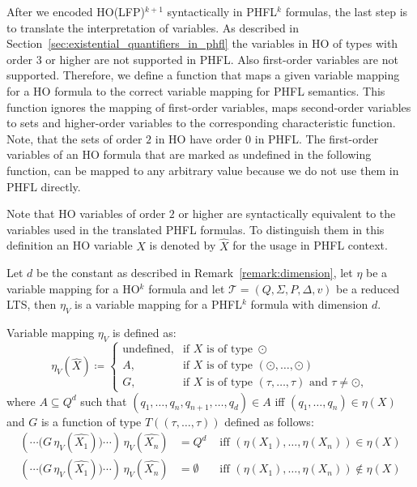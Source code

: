 After we encoded HO(LFP)$^{k+1}$ syntactically in PHFL$^k$ formulas, the last step is to translate the 
interpretation of variables. As described in Section~\ref{sec:existential_quantifiers_in_phfl} the variables in HO of 
types with order $3$ or higher are not supported in PHFL. Also first-order variables are not supported. Therefore, we 
define a function that maps a given variable mapping for a HO formula to the correct variable mapping for PHFL 
semantics. This function ignores the mapping of first-order variables, maps second-order variables to sets and 
higher-order variables to the corresponding characteristic function. Note, that the sets of order $2$ in HO have order 
$0$ in PHFL. The first-order variables of an HO formula that are marked as undefined in the following function, can be 
mapped to any arbitrary value because we do not use them in PHFL directly.

    Note that HO variables of order $2$ or higher are syntactically equivalent to the variables used in the translated PHFL formulas. To distinguish them in this definition an HO variable $X$ is denoted by $\hat{X}$ for the usage in PHFL context. 

\begin{definition}
    \label{definition:lower_bound_variable_function}
    Let $d$ be the constant as described in Remark~\ref{remark:dimension}, let $\eta$ be a
    variable mapping for a HO$^k$ formula and let $\mathcal{T} = (Q, \Sigma, P, \Delta, v)$ be a reduced LTS, then $\eta_V$ is a 
    variable mapping for a PHFL$^k$ formula with dimension $d$. 
    
    Variable mapping $\eta_V$ is defined as:
    \[\eta_V(\hat{X})\coloneqq
    \begin{cases}
        \text{undefined}, & \text{if } X \text{ is of type } \odot \\
        A,  & \text{if } X \text{ is of type } (\odot, \dots, \odot)\\
        G, & \text{if } X \text{ is of type } (\tau, \dots, \tau) \text{ and } \tau \neq \odot,
    \end{cases}\]
    where $A \subseteq Q^d$ such that $(q_1, \dots, q_n, q_{n + 1}, \dots, q_d) \in A$ iff $(q_1, \dots, q_n) \in
    \eta(X)$ and $G$ is a function of type $T((\tau, \dots, \tau))$ defined as follows:
    \begin{align*}
        (\dotsb\big(G\,\eta_V(\hat{X_1})\big)\dotsb)\,\eta_V(\hat{X_n}) &= Q^d &\text{ iff } (\eta(X_1), \dots, \eta(X_n)) \in \eta(X)\\
        (\dotsb\big(G\,\eta_V(\hat{X_1})\big)\dotsb)\,\eta_V(\hat{X_n}) &= \emptyset &\text{ iff } (\eta(X_1), \dots, \eta(X_n))
        \not\in \eta(X)
    \end{align*}
\end{definition}

